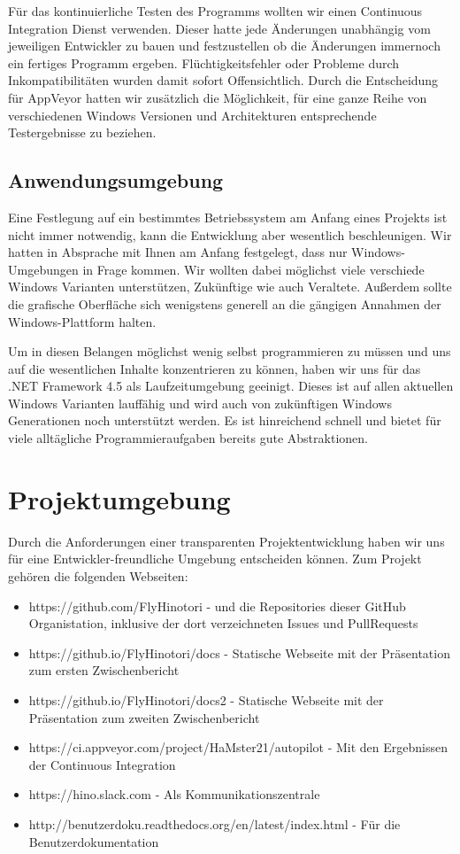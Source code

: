 \documentclass[12pt]{article}
\begin{document}
Für das kontinuierliche Testen des Programms wollten wir einen Continuous Integration Dienst verwenden. Dieser hatte jede Änderungen unabhängig vom jeweiligen Entwickler zu bauen und festzustellen ob die Änderungen immernoch ein fertiges Programm ergeben. Flüchtigkeitsfehler oder Probleme durch Inkompatibilitäten wurden damit sofort Offensichtlich. Durch die Entscheidung für AppVeyor hatten wir zusätzlich die Möglichkeit, für eine ganze Reihe von verschiedenen Windows Versionen und Architekturen entsprechende Testergebnisse zu beziehen.

\subsection{Anwendungsumgebung}

Eine Festlegung auf ein bestimmtes Betriebssystem am Anfang eines Projekts ist nicht immer notwendig, kann die Entwicklung aber wesentlich beschleunigen. Wir hatten in Absprache mit Ihnen am Anfang festgelegt, dass nur Windows-Umgebungen in Frage kommen. Wir wollten dabei möglichst viele verschiede Windows Varianten unterstützen, Zukünftige wie auch Veraltete. Außerdem sollte die grafische Oberfläche sich wenigstens generell an die gängigen Annahmen der Windows-Plattform halten.
\newline

Um in diesen Belangen möglichst wenig selbst programmieren zu müssen und uns auf die wesentlichen Inhalte konzentrieren zu können, haben wir uns für das .NET Framework 4.5 als Laufzeitumgebung geeinigt. Dieses ist auf allen aktuellen Windows Varianten lauffähig und wird auch von zukünftigen Windows Generationen noch unterstützt werden. Es ist hinreichend schnell und bietet für viele alltägliche Programmieraufgaben bereits gute Abstraktionen.

\newpage
\section{Projektumgebung}

Durch die Anforderungen einer transparenten Projektentwicklung haben wir uns für eine Entwickler-freundliche Umgebung entscheiden können. Zum Projekt gehören die folgenden Webseiten:

\begin{itemize}
  \item https://github.com/FlyHinotori - und die Repositories dieser GitHub Organistation, inklusive der dort verzeichneten Issues und PullRequests
  \item https://github.io/FlyHinotori/docs - Statische Webseite mit der Präsentation zum ersten Zwischenbericht
  \item https://github.io/FlyHinotori/docs2 - Statische Webseite mit der Präsentation zum zweiten Zwischenbericht
  \item https://ci.appveyor.com/project/HaMster21/autopilot - Mit den Ergebnissen der Continuous Integration
  \item https://hino.slack.com - Als Kommunikationszentrale
  \item http://benutzerdoku.readthedocs.org/en/latest/index.html - Für die Benutzerdokumentation
\end{itemize}
\end{document}
